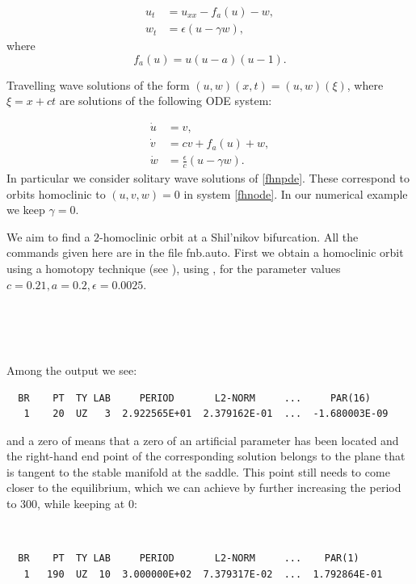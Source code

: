 \begin{equation}
\begin{split}
u_t&=u_{xx}-f_a(u)-w, \\
w_t&=\epsilon(u-\gamma w),
\end{split}
\label{fhnpde}
\end{equation}
where
\[
f_a(u) = u (u-a)(u-1).
\]

Travelling wave solutions of the form $(u,w)(x,t)=(u,w)(\xi)$, where
$\xi=x+ct$ are solutions of the following ODE system:

\begin{equation}
\begin{split}
\dot u &= v,\\
\dot v &= c v + f_a(u) + w,\\
\dot w &= \frac{\epsilon}{c} (u - \gamma w).
\end{split}
\label{fhnode}
\end{equation}
In particular we consider solitary wave solutions of \eqref{fhnpde}.
These correspond to orbits homoclinic to $(u,v,w)=0$ in system \eqref{fhnode}.
In our numerical example we keep $\gamma=0$.

We aim to find a $2$-homoclinic orbit at a Shil'nikov bifurcation.
All the commands given here are in the file fnb.auto.
First we obtain a homoclinic orbit using a homotopy technique (see
), using , for the parameter 
values $c=0.21, a=0.2, \epsilon=0.0025$.

\begin{center}
\\
\\
\\
\end{center}

Among the output we see:
\begin{verbatim}
  BR    PT  TY LAB     PERIOD       L2-NORM     ...     PAR(16)    
   1    20  UZ   3  2.922565E+01  2.379162E-01  ...  -1.680003E-09
\end{verbatim}
and a zero of  means that a zero of an artificial parameter has
been located and the right-hand end point of the corresponding
solution belongs to the plane that is tangent to the stable manifold
at the saddle. This point still needs to come closer to the
equilibrium, which we can achieve by further increasing the period to
300, while keeping  at 0:
\begin{center}
\\
\end{center}
\begin{verbatim}
  BR    PT  TY LAB     PERIOD       L2-NORM     ...    PAR(1)     
   1   190  UZ  10  3.000000E+02  7.379317E-02  ...  1.792864E-01
\end{verbatim}

